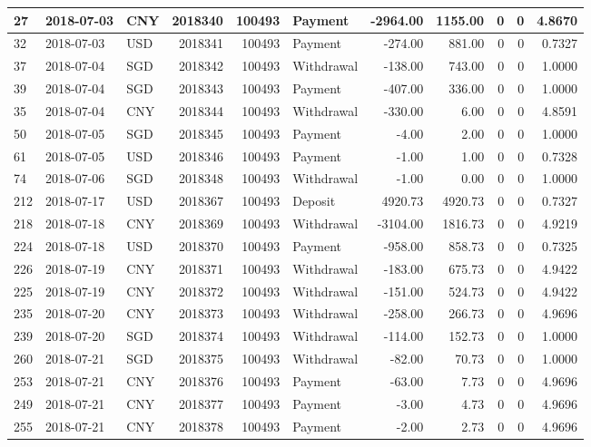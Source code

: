 \documentclass[]{article}
\begin{document}
\begin{table}[H]
\begin{tabular}{l|l|l|r|r|l|r|r|r|r|r}
\hline
27 & 2018-07-03 & CNY & 2018340 & 100493 & Payment & -2964.00 & 1155.00 & 0 & 0 & 4.8670\\
\hline
32 & 2018-07-03 & USD & 2018341 & 100493 & Payment & -274.00 & 881.00 & 0 & 0 & 0.7327\\
\hline
37 & 2018-07-04 & SGD & 2018342 & 100493 & Withdrawal & -138.00 & 743.00 & 0 & 0 & 1.0000\\
\hline
39 & 2018-07-04 & SGD & 2018343 & 100493 & Payment & -407.00 & 336.00 & 0 & 0 & 1.0000\\
\hline
35 & 2018-07-04 & CNY & 2018344 & 100493 & Withdrawal & -330.00 & 6.00 & 0 & 0 & 4.8591\\
\hline
50 & 2018-07-05 & SGD & 2018345 & 100493 & Payment & -4.00 & 2.00 & 0 & 0 & 1.0000\\
\hline
61 & 2018-07-05 & USD & 2018346 & 100493 & Payment & -1.00 & 1.00 & 0 & 0 & 0.7328\\
\hline
74 & 2018-07-06 & SGD & 2018348 & 100493 & Withdrawal & -1.00 & 0.00 & 0 & 0 & 1.0000\\
\hline
212 & 2018-07-17 & USD & 2018367 & 100493 & Deposit & 4920.73 & 4920.73 & 0 & 0 & 0.7327\\
\hline
218 & 2018-07-18 & CNY & 2018369 & 100493 & Withdrawal & -3104.00 & 1816.73 & 0 & 0 & 4.9219\\
\hline
224 & 2018-07-18 & USD & 2018370 & 100493 & Payment & -958.00 & 858.73 & 0 & 0 & 0.7325\\
\hline
226 & 2018-07-19 & CNY & 2018371 & 100493 & Withdrawal & -183.00 & 675.73 & 0 & 0 & 4.9422\\
\hline
225 & 2018-07-19 & CNY & 2018372 & 100493 & Withdrawal & -151.00 & 524.73 & 0 & 0 & 4.9422\\
\hline
235 & 2018-07-20 & CNY & 2018373 & 100493 & Withdrawal & -258.00 & 266.73 & 0 & 0 & 4.9696\\
\hline
239 & 2018-07-20 & SGD & 2018374 & 100493 & Withdrawal & -114.00 & 152.73 & 0 & 0 & 1.0000\\
\hline
260 & 2018-07-21 & SGD & 2018375 & 100493 & Withdrawal & -82.00 & 70.73 & 0 & 0 & 1.0000\\
\hline
253 & 2018-07-21 & CNY & 2018376 & 100493 & Payment & -63.00 & 7.73 & 0 & 0 & 4.9696\\
\hline
249 & 2018-07-21 & CNY & 2018377 & 100493 & Payment & -3.00 & 4.73 & 0 & 0 & 4.9696\\
\hline
255 & 2018-07-21 & CNY & 2018378 & 100493 & Payment & -2.00 & 2.73 & 0 & 0 & 4.9696\\

\end{tabular}
\end{table}
\end{document}
